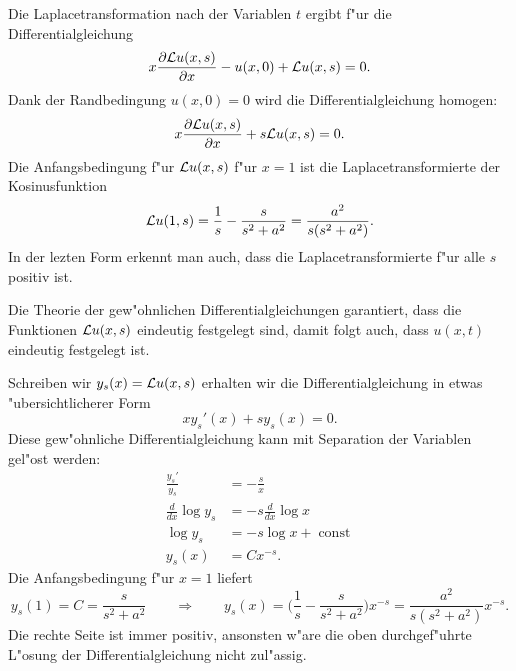 \begin{loesung}
\begin{teilaufgaben}
\item
Die Laplacetransformation nach der Variablen $t$
ergibt f"ur die Differentialgleichung
\[
x\frac{\partial{\cal L}u(x,s)}{\partial x}
-
u(x,0)+{\cal L}u(x,s)=0.
\]
Dank der Randbedingung $u(x,0)=0$ wird die Differentialgleichung
homogen:
\[
x\frac{\partial{\cal L}u(x,s)}{\partial x}
+
s{\cal L}u(x,s)=0.
\]
Die Anfangsbedingung f"ur ${\cal L}u(x,s)$ f"ur $x=1$ ist die
Laplacetransformierte der Kosinusfunktion
\[
{\cal L}u(1,s)=\frac1s-\frac{s}{s^2+a^2} = \frac{a^2}{s(s^2+a^2)}.
\]
In der lezten Form erkennt man auch, dass die Laplacetransformierte
f"ur alle $s$ positiv ist.
\item
Die Theorie der gew"ohnlichen Differentialgleichungen garantiert, dass
die Funktionen ${\cal L}u(x,s)$ eindeutig festgelegt sind, damit folgt
auch, dass $u(x,t)$ eindeutig festgelegt ist.
\item
Schreiben wir $y_s(x)={\cal L}u(x,s)$ erhalten wir die Differentialgleichung
in etwas "ubersichtlicherer Form
\begin{equation}
xy_s'(x)+sy_s(x)=0.
\label{50000008:sdgl}
\end{equation}
Diese gew"ohnliche Differentialgleichung kann mit Separation der
Variablen gel"ost werden:
\begin{align*}
\frac{y_s'}{y_s}&=-\frac{s}{x}
\\
\frac{d}{dx}\log y_s&=-s\frac{d}{dx}\log x
\\
\log y_s&=-s\log x+\operatorname{const}
\\
y_s(x)&=Cx^{-s}.
\end{align*}
Die Anfangsbedingung f"ur $x=1$ liefert
\begin{equation}
y_s(1)=C=\frac{s}{s^2+a^2}
\qquad\Rightarrow\qquad
y_s(x)
=
\biggl(\frac1s-\frac{s}{s^2+a^2}\biggr)x^{-s}
=
\frac{a^2}{s(s^2+a^2)}x^{-s}.
\label{50000008:loesung}
\end{equation}
Die rechte Seite ist immer positiv, ansonsten w"are die oben durchgef"uhrte
L"osung der Differentialgleichung nicht zul"assig.
\end{teilaufgaben}
\end{loesung}

